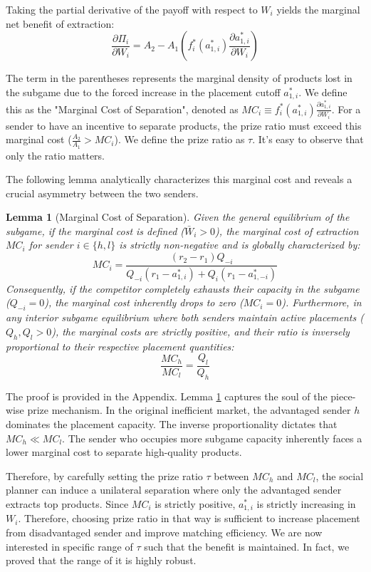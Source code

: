 \documentclass[12pt, a4paper]{article}
\newtheorem{lemma}{Lemma}
\begin{document}
Taking the partial derivative of the payoff with respect to $W_i$ yields the marginal net benefit of extraction:
$$\frac{\partial \Pi_i}{\partial W_i} = A_2 - A_1 \left( f_i^*(a_{1,i}^*) \frac{\partial a_{1,i}^*}{\partial W_i} \right)$$

The term in the parentheses represents the marginal density of products lost in the subgame due to the forced increase in the placement cutoff $a_{1,i}^*$. We define this as the "Marginal Cost of Separation", denoted as $MC_i \equiv f_i^*(a_{1,i}^*) \frac{\partial a_{1,i}^*}{\partial W_i}$. For a sender to have an incentive to separate products, the prize ratio must exceed this marginal cost ($\frac{A_2}{A_1} > MC_i$). We define the prize ratio as $\tau$. It's easy to observe that only the ratio matters. 

The following lemma analytically characterizes this marginal cost and reveals a crucial asymmetry between the two senders.

\begin{lemma}[Marginal Cost of Separation]
\label{Lemma: Marginal Cost}
Given the general equilibrium of the subgame, if the marginal cost is defined ($\bar{W}_i > 0$), the marginal cost of extraction $MC_i$ for sender $i \in \{h, l\}$ is strictly non-negative and is globally characterized by:
$$MC_i = \frac{(r_2 - r_1)Q_{-i}}{Q_{-i}(r_1 - a_{1,i}^*) + Q_i(r_1 - a_{1,-i}^*)}$$
Consequently, if the competitor completely exhausts their capacity in the subgame ($Q_{-i}=0$), the marginal cost inherently drops to zero ($MC_i=0$). Furthermore, in any interior subgame equilibrium where both senders maintain active placements ($Q_h, Q_l > 0$), the marginal costs are strictly positive, and their ratio is inversely proportional to their respective placement quantities:
$$\frac{MC_h}{MC_l} = \frac{Q_l}{Q_h}$$
\end{lemma}

The proof is provided in the Appendix. Lemma \ref{Lemma: Marginal Cost} captures the soul of the piece-wise prize mechanism. In the original inefficient market, the advantaged sender $h$ dominates the placement capacity. The inverse proportionality dictates that $MC_h \ll MC_l$. The sender who occupies more subgame capacity inherently faces a lower marginal cost to separate high-quality products. 

Therefore, by carefully setting the prize ratio $\tau$ between $MC_h$ and $MC_l$, the social planner can induce a unilateral separation where only the advantaged sender extracts top products. Since $MC_i$ is strictly positive, $a^*_{1,i}$ is strictly increasing in $W_i$. Therefore, choosing prize ratio in that way is sufficient to increase placement from disadvantaged sender and improve matching efficiency. We are now interested in specific range of $\tau$ such that the benefit is maintained. In fact, we proved that the range of it is highly robust.  
\end{document}
